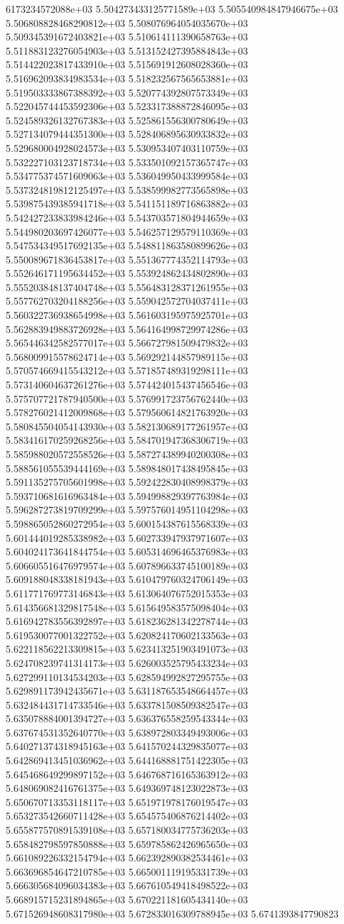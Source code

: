 6173234572088e+03	5.504273433125771589e+03	5.505540984847946675e+03	5.506808828468290812e+03	5.508076964054035670e+03	5.509345391672403821e+03	5.510614111390658763e+03	5.511883123276054903e+03	5.513152427395884843e+03	5.514422023817433910e+03	5.515691912608028360e+03	5.516962093834983534e+03	5.518232567565653881e+03	5.519503333867388392e+03	5.520774392807573349e+03	5.522045744453592306e+03	5.523317388872846095e+03	5.524589326132767383e+03	5.525861556300780649e+03	5.527134079444351300e+03	5.528406895630933832e+03	5.529680004928024573e+03	5.530953407403110759e+03	5.532227103123718734e+03	5.533501092157365747e+03	5.534775374571609063e+03	5.536049950433999584e+03	5.537324819812125497e+03	5.538599982773565898e+03	5.539875439385941718e+03	5.541151189716863882e+03	5.542427233833984246e+03	5.543703571804944659e+03	5.544980203697426077e+03	5.546257129579110369e+03	5.547534349517692135e+03	5.548811863580899626e+03	5.550089671836453817e+03	5.551367774352114793e+03	5.552646171195634452e+03	5.553924862434802890e+03	5.555203848137404748e+03	5.556483128371261955e+03	5.557762703204188256e+03	5.559042572704037411e+03	5.560322736938654998e+03	5.561603195975925701e+03	5.562883949883726928e+03	5.564164998729974286e+03	5.565446342582577017e+03	5.566727981509479832e+03	5.568009915578624714e+03	5.569292144857989115e+03	5.570574669415543212e+03	5.571857489319298111e+03	5.573140604637261276e+03	5.574424015437456546e+03	5.575707721787940500e+03	5.576991723756762440e+03	5.578276021412009868e+03	5.579560614821763920e+03	5.580845504054143930e+03	5.582130689177261957e+03	5.583416170259268256e+03	5.584701947368306719e+03	5.585988020572558526e+03	5.587274389940200308e+03	5.588561055539444169e+03	5.589848017438495845e+03	5.591135275705601998e+03	5.592422830408998379e+03	5.593710681616963484e+03	5.594998829397763984e+03	5.596287273819709299e+03	5.597576014951104298e+03	5.598865052860272954e+03	5.600154387615568339e+03	5.601444019285338982e+03	5.602733947937971607e+03	5.604024173641844754e+03	5.605314696465376983e+03	5.606605516476979574e+03	5.607896633745100189e+03	5.609188048338181943e+03	5.610479760324706149e+03	5.611771769773146843e+03	5.613064076752015353e+03	5.614356681329817548e+03	5.615649583575098404e+03	5.616942783556392897e+03	5.618236281342278744e+03	5.619530077001322752e+03	5.620824170602133563e+03	5.622118562213309815e+03	5.623413251903491073e+03	5.624708239741314173e+03	5.626003525795433234e+03	5.627299110134534203e+03	5.628594992827295755e+03	5.629891173942435671e+03	5.631187653548664457e+03	5.632484431714733546e+03	5.633781508509382547e+03	5.635078884001394727e+03	5.636376558259543344e+03	5.637674531352640770e+03	5.638972803349493006e+03	5.640271374318945163e+03	5.641570244329835077e+03	5.642869413451036962e+03	5.644168881751422305e+03	5.645468649299897152e+03	5.646768716165363912e+03	5.648069082416761375e+03	5.649369748123022873e+03	5.650670713353118117e+03	5.651971978176019547e+03	5.653273542660711428e+03	5.654575406876214402e+03	5.655877570891539108e+03	5.657180034775736203e+03	5.658482798597850888e+03	5.659785862426965650e+03	5.661089226332154794e+03	5.662392890382534461e+03	5.663696854647210785e+03	5.665001119195331739e+03	5.666305684096034383e+03	5.667610549418498522e+03	5.668915715231894865e+03	5.670221181605434140e+03	5.671526948608317980e+03	5.672833016309788945e+03	5.6741393847790823